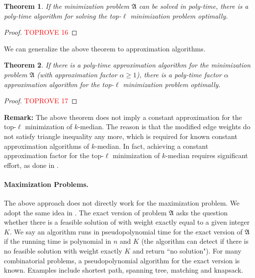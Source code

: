 \documentclass[11pt,a4paper]{article} \usepackage{enumitem}
\newcommand{\myproblem}{\mathfrak{A}}
\newtheorem{theorem}{Theorem}[section]
\theoremstyle{definition}
\begin{document}
\begin{theorem} \label{thm:topl-1}
If the minimization problem $\myproblem$ can be solved in poly-time, 
there is a poly-time algorithm for solving the top-$\ell$ {\em minimization} problem optimally.
\end{theorem}

\begin{proof}\textcolor{red}{TOPROVE 16}\end{proof}

We can generalize the above theorem to approximation algorithms.

\begin{theorem}
If there is a poly-time approximation algorithm for the minimization problem $\myproblem$ (with approximation factor $\alpha\geq 1$), 
there is a poly-time factor $\alpha$ approximation algorithm for the top-$\ell$ {\em minimization} problem optimally.
\end{theorem}
\begin{proof}\textcolor{red}{TOPROVE 17}\end{proof}

\noindent
{\bf Remark:}
The above theorem does not imply a constant approximation for the top-$\ell$ minimization of $k$-median. 
The reason is that the modified edge weights do not satisfy triangle inequality
any more, which is required for known constant approximation algorithms of $k$-median.
In fact, achieving a constant approximation factor for the top-$\ell$ minimization of $k$-median requires significant effort, as done in \cite{chakrabarty2018interpolating,byrka2018constant,chakrabarty2019approximation}.

\paragraph{Maximization Problems.}

The above approach does not directly work for the maximization problem.
We adopt the same idea in \cite{maalouly2022exact}.
The exact version of problem $\myproblem$ asks the question whether there is a feasible solution of with weight exactly equal to a given integer $K$. We say an algorithm runs in pseudopolynomial time for
the exact version of $\myproblem$ if the running time is 
polynomial in $n$ and $K$ (the algorithm can detect if there is no feasible solution with weight exactly $K$ and return ``no solution"). For many combinatorial problems, 
a pseudopolynomial algorithm for the exact version is known. Examples include shortest path, spanning tree, matching and knapsack.
\end{document}
